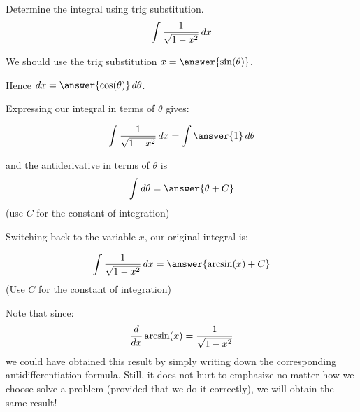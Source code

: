 \documentclass{ximera}
\author{Jason Miller}
\begin{document}
\begin{exercise}
Determine the integral using trig substitution. 
\[
\int \frac{1}{\sqrt{1-x^{2}}} \mathop{}\!d x
\]

We should use the trig substitution $x=\answer{ \sin(\theta)}$. 

Hence $\d x=\answer{ \cos(\theta) } \d \theta$.

Expressing our integral in terms of $\theta$ gives:

\begin{exercise}

\[
\int \frac{1}{\sqrt{1-x^{2}}} \d x=\int \answer{ 1  }   \d \theta 
\]


and the antiderivative in terms of $\theta$ is 
\[
\int \d \theta = \answer{ \theta + C}
\]
(use $C$ for the constant of integration)

\begin{exercise}
Switching back to the variable $x$, our original integral is:

\[
\int \frac{1}{\sqrt{1-x^{2}}} \d x= \answer{ \arcsin(x) + C }
\]
(Use $C$ for the constant of integration)

\begin{feedback}
Note that since:
\[
\frac{d}{\mathop{}\!d x} \arcsin(x)=\frac{1}{\sqrt{1-x^{2}}}
\]
we could have obtained this result by simply writing down the corresponding antidifferentiation formula.  Still, it does not hurt to emphasize no matter how we choose solve a problem (provided that we do it correctly), we will obtain the same result!

\end{feedback}
\end{exercise}
\end{exercise}
\end{exercise}
\end{document}
